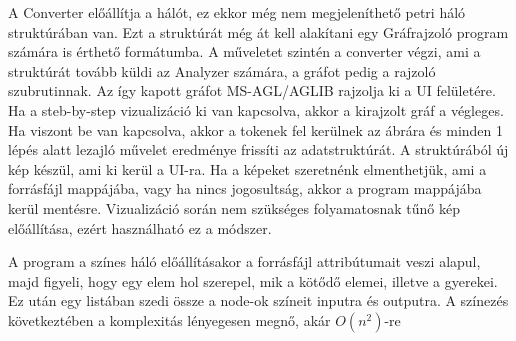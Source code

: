 A Converter előállítja a hálót, ez ekkor még nem megjeleníthető petri háló struktúrában van. Ezt a struktúrát még át kell alakítani egy Gráfrajzoló program számára is érthető formátumba. A műveletet szintén a converter végzi, ami a struktúrát tovább küldi az Analyzer számára, a gráfot pedig a rajzoló szubrutinnak. Az így kapott gráfot MS-AGL/AGLIB rajzolja ki a UI felületére. Ha a steb-by-step vizualizáció ki van kapcsolva, akkor a kirajzolt gráf a végleges. Ha viszont be van kapcsolva, akkor a tokenek fel kerülnek az ábrára és minden 1 lépés alatt lezajló művelet eredménye frissíti az adatstruktúrát. A struktúrából új kép készül, ami ki kerül a UI-ra. Ha a képeket szeretnénk elmenthetjük, ami a forrásfájl mappájába, vagy ha nincs jogosultság, akkor a program mappájába kerül mentésre. Vizualizáció során nem szükséges folyamatosnak tűnő kép előállítása, ezért használható ez a módszer. 

A program a színes háló előállításakor a forrásfájl attribútumait veszi alapul, majd figyeli, hogy egy elem hol szerepel, mik a kötődő elemei, illetve a gyerekei. Ez után egy listában szedi össze a node-ok színeit inputra és outputra. A színezés következtében a komplexitás lényegesen megnő, akár $O(n^2)$-re

